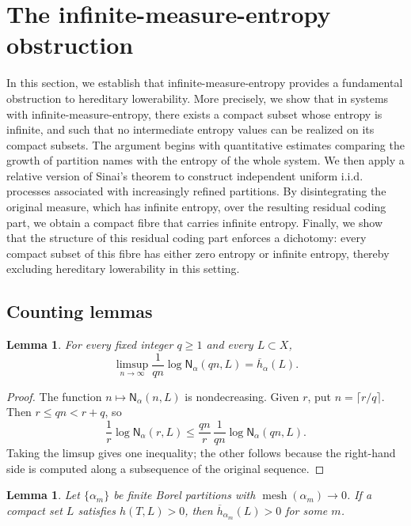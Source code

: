\documentclass[10pt,a4paper]{amsart}
\newcommand{\mesh}{\operatorname{mesh}}
\newcommand{\Nname}{\mathsf N}
\newtheorem{lemma}[theorem]{Lemma}
\numberwithin{equation}{section}
\begin{document}
	\section{The infinite-measure-entropy obstruction}
	\label{sec:infinite-obstruction}
    In this section, we establish that infinite-measure-entropy provides a fundamental obstruction to hereditary lowerability. More precisely, we show that in systems with infinite-measure-entropy, there exists a compact subset whose entropy is infinite, and such that no intermediate entropy values can be realized on its compact subsets. The argument begins with quantitative estimates comparing the growth of partition names with the  entropy of the whole system. We then apply a relative version of Sinai’s theorem to construct independent uniform i.i.d. processes associated with increasingly refined partitions. By disintegrating the original measure, which has infinite entropy, over the resulting residual coding part, we obtain a compact fibre that carries infinite entropy. Finally, we show that the structure of this residual coding part enforces a dichotomy: every compact subset of this fibre has either zero entropy or infinite entropy, thereby excluding hereditary lowerability in this setting.
    
	\subsection{Counting lemmas}
	\label{sec:counting}
	
	\begin{lemma}
		\label{lem:subsequence}
		For every fixed integer $q\geq1$ and every $L\subset X$,
		\[
		\limsup_{n\to\infty}
		\frac1{qn}\log\Nname_\alpha(qn,L)
		=
		\overline h_\alpha(L).
		\]
	\end{lemma}
	
	\begin{proof}
		The function $n\mapsto\Nname_\alpha(n,L)$ is nondecreasing. Given $r$, put
		$n=\lceil r/q\rceil$. Then $r\leq qn<r+q$, so
		\[
		\frac1r\log\Nname_\alpha(r,L)
		\leq
		\frac{qn}{r}\,
		\frac1{qn}\log\Nname_\alpha(qn,L).
		\]
		Taking the limsup gives one inequality; the other follows because the
		right-hand side is computed along a subsequence of the original sequence.
	\end{proof}
	
	\begin{lemma}
		\label{lem:mesh}
		Let $\{\alpha_m\}$ be finite Borel partitions with
		$\mesh(\alpha_m)\to0$. If a compact set $L$ satisfies $h(T,L)>0$, then
		$\overline h_{\alpha_m}(L)>0$ for some $m$.
	\end{lemma}
	
\end{document}
